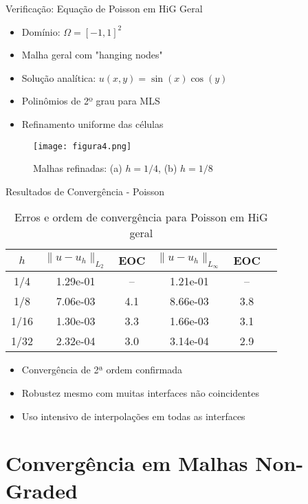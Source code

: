\documentclass[../main/main.tex]{subfiles}
\begin{document}
\begin{frame}{Verificação: Equação de Poisson em HiG Geral}
\begin{itemize}
\item Domínio: $\Omega = [-1, 1]^2$
\item Malha geral com "hanging nodes"
\item Solução analítica: $u(x, y) = \sin(x)\cos(y)$
\item Polinômios de 2º grau para MLS
\item Refinamento uniforme das células
\end{itemize}

\begin{figure}
\centering
\texttt{[image: figura4.png]}
\caption{Malhas refinadas: (a) $h=1/4$, (b) $h=1/8$}
\end{figure}
\end{frame}

\begin{frame}{Resultados de Convergência - Poisson}
\begin{table}
\centering
\caption{Erros e ordem de convergência para Poisson em HiG geral}
\begin{tabular}{cccccc}
\toprule
$h$ & $\|u-u_h\|_{L_2}$ & EOC & $\|u-u_h\|_{L_\infty}$ & EOC \\
\midrule
1/4 & 1.29e-01 & -- & 1.21e-01 & -- \\
1/8 & 7.06e-03 & 4.1 & 8.66e-03 & 3.8 \\
1/16 & 1.30e-03 & 3.3 & 1.66e-03 & 3.1 \\
1/32 & 2.32e-04 & 3.0 & 3.14e-04 & 2.9 \\
\bottomrule
\end{tabular}
\end{table}

\begin{itemize}
\item Convergência de 2ª ordem confirmada
\item Robustez mesmo com muitas interfaces não coincidentes
\item Uso intensivo de interpolações em todas as interfaces
\end{itemize}
\end{frame}

\section{Convergência em Malhas Non-Graded}
\end{document}

